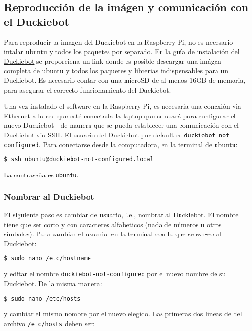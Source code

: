 \documentclass[12pt]{article}
\begin{document}
\subsection{Reproducción de la imágen y comunicación con el Duckiebot}

Para reproducir la imagen del Duckiebot en la Raspberry Pi, no es necesario intalar ubuntu y todos los paquetes por separado. En la \href{https://bit.ly/2xBma5N}{guía de instalación del Duckiebot} se proporciona un link donde es posible descargar una imágen completa de ubuntu y todos los paquetes y librerias indispensables para un Duckiebot. Es necesario contar con una microSD de al menos 16GB de memoria, para asegurar el correcto funcionamiento del Duckiebot. 

Una vez instalado el software en la Raspberry Pi, es necesaria una conexión via Ethernet a la red que esté conectada la laptop que se usará para configurar el nuevo Duckiebot---de manera que se pueda establecer una comunicación con el Duckiebot via SSH. El usuario del Duckiebot por default es \texttt{duckiebot-not-configured}. Para conectarse desde la computadora, en la terminal de ubuntu:

\begin{lstlisting}[language=bash]
  $ ssh ubuntu@duckiebot-not-configured.local
\end{lstlisting}

La contraseña es \texttt{ubuntu}.

\subsubsection{Nombrar al Duckiebot}

El siguiente paso es cambiar de usuario, i.e., nombrar al Duckiebot. El nombre tiene que ser corto y con caracteres alfabeticos (nada de números u otros símbolos). Para cambiar el usuario, en la terminal con la que se ssh-eo al Duckiebot:

\begin{lstlisting}[language=bash]
  $ sudo nano /etc/hostname
\end{lstlisting} 

y editar el nombre \texttt{duckiebot-not-configured} por el nuevo nombre de su Duckiebot. De la misma manera:

\begin{lstlisting}[language=bash]
  $ sudo nano /etc/hosts
\end{lstlisting}

y cambiar el mismo nombre por el nuevo elegido. Las primeras dos líneas de del archivo \texttt{/etc/hosts} deben ser:
\end{document}
